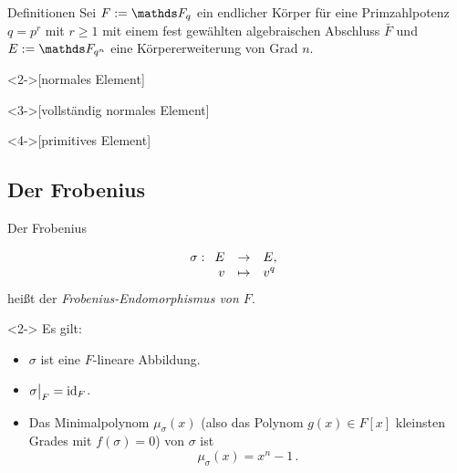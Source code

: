 \documentclass{vorlage}
\begin{document}
\begin{frame}{Definitionen}
  Sei $F := \F_q$ ein endlicher Körper für eine 
  Primzahlpotenz $q = p^r$ mit $r \geq 1$ mit einem
  fest gewählten algebraischen Abschluss $\bar F$
  und $E := \F_{q^n}$ eine
  Körpererweiterung von Grad $n$.
\begin{definition}<2->[normales Element]
\end{definition}
\begin{definition}<3->[vollständig normales Element]
\end{definition}
\begin{definition}<4->[primitives Element]
\end{definition}
\end{frame}


\subsection{Der Frobenius}

\begin{frame}{Der Frobenius}
  \begin{definition}
    \[ \sigma: \funcdef{E &\to& E,\\
      v &\mapsto& v^q}\]
      heißt der \emph{Frobenius-Endomorphismus von $F$}.
  \end{definition}
  \begin{satz}<2->
    Es gilt:
    \begin{itemize}
      \item $\sigma$ ist eine $F$-lineare Abbildung.
      \item<3-> $\sigma\big|_{F} = \operatorname{id}_F$.
      \item<4-> Das Minimalpolynom $\mu_\sigma(x)$ (also das 
        Polynom $g(x)\in F[x]$ kleinsten Grades mit $f(\sigma) = 0$)
        von $\sigma$ ist
        \[\mu_\sigma(x) = x^n-1\,.\]
    \end{itemize}
  \end{satz}
\end{frame}
\end{document}

